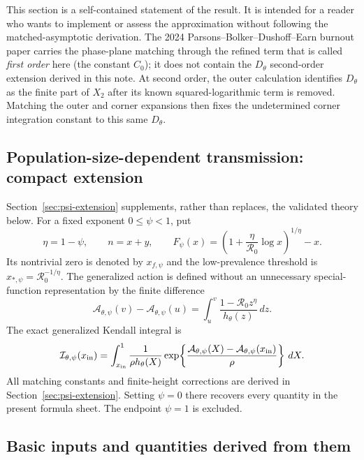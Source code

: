 \documentclass[11pt,a4paper]{article}
\newcommand{\Rzero}{\mathcal R_0}
\begin{document}
This section is a self-contained statement of the result.  It is intended for a
reader who wants to implement or assess the approximation without following the
matched-asymptotic derivation.  The 2024 Parsons--Bolker--Dushoff--Earn burnout
paper carries the phase-plane matching through the refined term that is called
\emph{first order} here (the constant $C_0$); it does not contain the
$D_\theta$ second-order extension derived in this note.  At second order, the
outer calculation identifies $D_\theta$ as the finite part of $X_2$ after its
known squared-logarithmic term is removed.  Matching the outer and corner
expansions then fixes the undetermined corner integration constant to this same
$D_\theta$.

\subsection{Population-size-dependent transmission: compact extension}
Section~\ref{sec:psi-extension} supplements, rather than replaces, the
validated theory below.  For a fixed exponent $0\leq\psi<1$, put
\[
 \eta=1-\psi,\qquad n=x+y,\qquad
 F_\psi(x)=\left(1+\frac{\eta}{\Rzero}\log x\right)^{1/\eta}-x.
\]
Its nontrivial zero is denoted by $x_{f,\psi}$ and the low-prevalence threshold
is $x_{*,\psi}=\Rzero^{-1/\eta}$.  The generalized action is defined without
an unnecessary special-function representation by the finite difference
\begin{equation}
 \mathcal A_{\theta,\psi}(v)-\mathcal A_{\theta,\psi}(u)
 =\int_u^v\frac{1-\Rzero z^\eta}{h_\theta(z)}\,dz.
 \label{eq:exec-Apsi}
\end{equation}
The exact generalized Kendall integral is
\begin{equation}
 \mathcal I_{\theta,\psi}(x_{\rm in})
 =\int_{x_{\rm in}}^1\frac{1}{\rho h_\theta(X)}
 \exp\!\left\{\frac{\mathcal A_{\theta,\psi}(X)
 -\mathcal A_{\theta,\psi}(x_{\rm in})}{\rho}\right\}\,dX .
 \label{eq:exec-Kendall-psi}
\end{equation}
All matching constants and finite-height corrections are derived in
Section~\ref{sec:psi-extension}.  Setting $\psi=0$ there recovers every
quantity in the present formula sheet.  The endpoint $\psi=1$ is excluded.

\subsection{Basic inputs and quantities derived from them}
\end{document}
